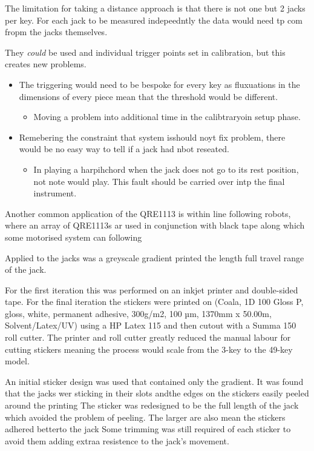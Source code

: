 The limitation for taking a distance approach is that there is not one
but 2 jacks per key. For each jack to be measured indepeedntly the data
would need tp com fropm the jacks themselves.

They \emph{could} be used and individual trigger points set in
calibration, but this creates new problems.

\begin{itemize}
\item
  The triggering would need to be bespoke for every key as fluxuations
  in the dimensions of every piece mean that the threshold would be
  different.

  \begin{itemize}
  \item
    Moving a problem into additional time in the calibtraryoin setup
    phase.
  \end{itemize}
\item
  Remebering the constraint that system isshould noyt fix problem, there
  would be no easy way to tell if a jack had nbot reseated.

  \begin{itemize}
  \item
    In playing a harpihchord when the jack does not go to its rest
    position, not note would play. This fault should be carried over
    intp the final instrument.
  \end{itemize}
\end{itemize}

Another common application of the QRE1113 is within line following
robots, where an array of QRE1113s ar used in conjunction with black
tape along which some motorised system can following

Applied to the jacks was a greyscale gradient printed the length full
travel range of the jack.

For the first iteration this was performed on an inkjet printer and
double-sided tape. For the final iteration the stickers were printed on
(Coala, 1D 100 Gloss P, gloss, white, permanent adhesive, 300g/m2, 100
µm, 1370mm x 50.00m, Solvent/Latex/UV) using a HP Latex 115 and then
cutout with a Summa 150 roll cutter. The printer and roll cutter greatly
reduced the manual labour for cutting stickers meaning the process would
scale from the 3-key to the 49-key model.

An initial sticker design was used that contained only the gradient. It
was found that the jacks wer sticking in their slots andthe edges on the
stickers easily peeled around the printing The sticker was redesigned to
be the full length of the jack which avoided the problem of peeling. The
larger are also mean the stickers adhered betterto the jack Some
trimming was still required of each sticker to avoid them adding extraa
resistence to the jack's movement.

